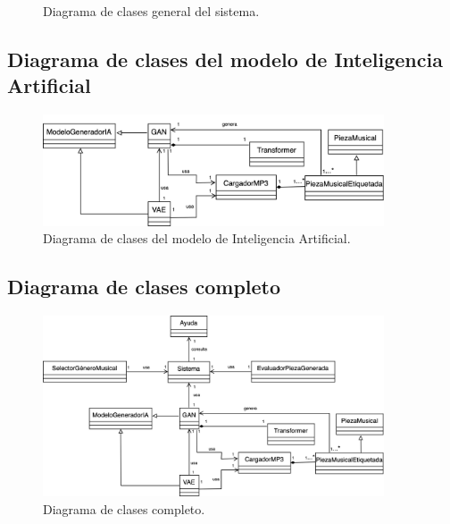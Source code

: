 \begin{figure}[H]
  \centering
  
  \caption{Diagrama de clases general del sistema.}
\end{figure}

\subsection{Diagrama de clases del modelo de Inteligencia Artificial}

\begin{figure}[H]
  \centering
  \includegraphics[width=0.9\textwidth]{images/diagrama-clases-ia.png}
  \caption{Diagrama de clases del modelo de Inteligencia Artificial.}
\end{figure}


\subsection{Diagrama de clases completo}

\begin{figure}[H]
  \centering
  \includegraphics[width=0.9\textwidth]{images/diagrama-clases-completo.png}
  \caption{Diagrama de clases completo.}
\end{figure}
